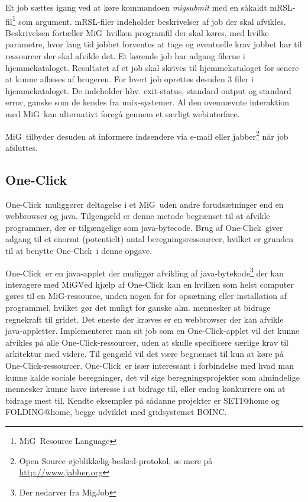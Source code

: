 \documentclass[pdf,draft,a4paper,11pt]{article}
\newcommand{\mig}{MiG}
\newcommand{\oc}{One-Click}
\begin{document}
Et job sættes igang ved at køre kommandoen \emph{migsubmit} med en såkaldt mRSL-fil\footnote{\mig\ Resource Language} som argument. mRSL-filer indeholder beskrivelser af job der skal afvikles. Beskrivelsen fortæller \mig\ hvilken programfil der skal køres, med hvilke parametre, hvor lang tid jobbet forventes at tage og eventuelle krav jobbet har til ressourcer der skal afvikle det. Et kørende job har adgang filerne i  hjemmekataloget. Resultatet af et job skal skrives til hjemmekataloget for senere at kunne aflæses af brugeren. For hvert job oprettes desuden 3 filer i hjemmekataloget. De indeholder hhv. exit-status, standard output og standard error, ganske som de kendes fra unix-systemer. Al den ovennævnte interaktion med \mig\ kan alternativt foregå gennem et særligt webinterface. 

\mig\ tilbyder desuden at informere indsendere via e-mail eller jabber\footnote{Open Source øjeblikkelig-besked-protokol, se mere på \url{http://www.jabber.org}} når job afsluttes. 


\subsection{\oc}\label{applet}
\oc\ muliggører deltagelse i et \mig\ uden andre forudsætninger end en webbrowser og java. Tilgengæld er denne metode begrænset til at afvikle programmer, der er tilgængelige som java-bytecode. Brug af \oc\ giver adgang til et enormt (potentielt) antal beregningsressourcer, hvilket er grunden til at benytte \oc\ i denne opgave.

\oc\ er en java-applet der muliggør afvikling af java-bytekode\footnote{Der nedarver fra MigJob} der kan interagere med \mig\. Ved hjælp af \oc\ kan en hvilken som helst computer gøres til en \mig-ressource, unden nogen for for opsætning eller installation af programmel, hvilket gør det muligt for ganske alm. mennesker at bidrage regnekraft til gridet. Det eneste der kræves er en webbrowser der kan afvikle java-appletter. Implementerer man sit job som en \oc-applet vil det kunne afvikles på alle \oc-ressourcer, uden at skulle specificere særlige krav til arkitektur med videre. Til gengæld vil det være begrænset til kun at køre på \oc-ressourcer. 
\oc\ er især interessant i forbindelse med hvad man kunne kalde sociale beregninger, det vil sige beregningsprojekter som almindelige mennesker kunne have interesse i at bidrage til, eller endog konkurrere om at bidrage mest til. Kendte eksempler på sådanne projekter er SETI@home og FOLDING@home, begge udviklet med gridsystemet BOINC\cite{boinc}. 
\end{document}
